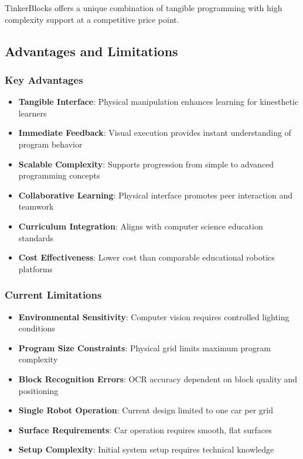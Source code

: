 TinkerBlocks offers a unique combination of tangible programming with high complexity support at a competitive price point.

\subsection{Advantages and Limitations}

\subsubsection{Key Advantages}

\begin{itemize}
    \item \textbf{Tangible Interface}: Physical manipulation enhances learning for kinesthetic learners
    \item \textbf{Immediate Feedback}: Visual execution provides instant understanding of program behavior
    \item \textbf{Scalable Complexity}: Supports progression from simple to advanced programming concepts
    \item \textbf{Collaborative Learning}: Physical interface promotes peer interaction and teamwork
    \item \textbf{Curriculum Integration}: Aligns with computer science education standards
    \item \textbf{Cost Effectiveness}: Lower cost than comparable educational robotics platforms
\end{itemize}

\subsubsection{Current Limitations}

\begin{itemize}
    \item \textbf{Environmental Sensitivity}: Computer vision requires controlled lighting conditions
    \item \textbf{Program Size Constraints}: Physical grid limits maximum program complexity
    \item \textbf{Block Recognition Errors}: OCR accuracy dependent on block quality and positioning
    \item \textbf{Single Robot Operation}: Current design limited to one car per grid
    \item \textbf{Surface Requirements}: Car operation requires smooth, flat surfaces
    \item \textbf{Setup Complexity}: Initial system setup requires technical knowledge
\end{itemize}

